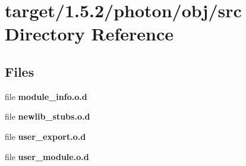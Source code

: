 \section{target/1.5.2/photon/obj/src Directory Reference}
\label{dir_08995c55150b4dbe17bdf1dbda5b6b1c}
\subsection*{Files}
\begin{DoxyCompactItemize}
\item 
file \textbf{ module\+\_\+info.\+o.\+d}
\item 
file \textbf{ newlib\+\_\+stubs.\+o.\+d}
\item 
file \textbf{ user\+\_\+export.\+o.\+d}
\item 
file \textbf{ user\+\_\+module.\+o.\+d}
\end{DoxyCompactItemize}
